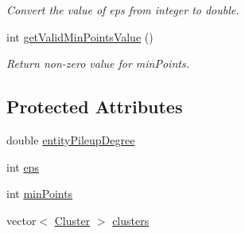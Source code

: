 \begin{DoxyCompactItemize}
\begin{DoxyCompactList}\small\item\em Convert the value of eps from integer to double. \end{DoxyCompactList}\item 
int \hyperlink{classmultiscale_1_1analysis_1_1ClusterDetector_ab1c2514fb8599f74bf010e81154a9bf7}{get\-Valid\-Min\-Points\-Value} ()
\begin{DoxyCompactList}\small\item\em Return non-\/zero value for min\-Points. \end{DoxyCompactList}\end{DoxyCompactItemize}
\subsection*{Protected Attributes}
\begin{DoxyCompactItemize}
\item 
double \hyperlink{classmultiscale_1_1analysis_1_1ClusterDetector_aaa93a4b3a5a3c4279aa434669093ac40}{entity\-Pileup\-Degree}
\item 
int \hyperlink{classmultiscale_1_1analysis_1_1ClusterDetector_a61e876f87d62245eada8f56d587d39cd}{eps}
\item 
int \hyperlink{classmultiscale_1_1analysis_1_1ClusterDetector_aa94df1adc462be5931ec25ba24122fe9}{min\-Points}
\item 
vector$<$ \hyperlink{classmultiscale_1_1analysis_1_1Cluster}{Cluster} $>$ \hyperlink{classmultiscale_1_1analysis_1_1ClusterDetector_aa81a8649bc743389c2fc1919d47eb5b3}{clusters}
\end{DoxyCompactItemize}
